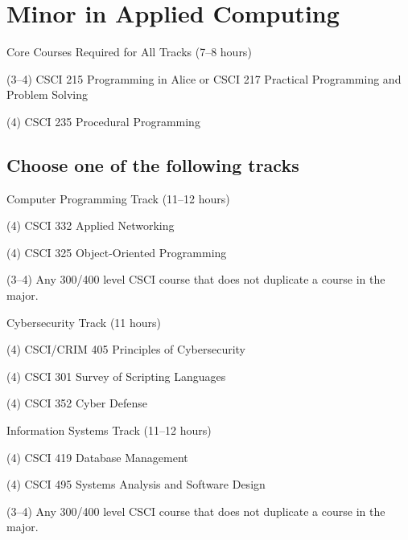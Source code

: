 %
\section*{Minor in Applied Computing}

\begin{reqgroup}{Core Courses Required for All Tracks (7--8 hours)}
\begin{checklist}
\begin{minipage}[t]{0.5\linewidth}
	\item (3--4) CSCI 215 Programming in Alice or CSCI 217 Practical Programming and Problem Solving
	\item (4) CSCI 235	Procedural Programming
\end{minipage}
\begin{minipage}[t]{0.5\linewidth}
\end{minipage}
\end{checklist}
\end{reqgroup}

\vspace{1em}
\subsection*{Choose one of the following tracks}

\begin{reqgroup}{Computer Programming Track (11--12 hours)}
\begin{checklist}
	\item (4) CSCI 332 Applied Networking
	\item (4) CSCI 325 Object-Oriented Programming
	\item (3--4) Any 300/400 level CSCI course that does not duplicate a course in the major.
\end{checklist}
\end{reqgroup}

\begin{reqgroup}{Cybersecurity Track (11 hours)}
\begin{checklist}
	\item (4) CSCI/CRIM 405 Principles of Cybersecurity
	\item (4) CSCI 301 Survey of Scripting Languages
	\item (4) CSCI 352 Cyber Defense
\end{checklist}
\end{reqgroup}

\begin{reqgroup}{Information Systems Track (11--12 hours)}
\begin{checklist}
	\item (4) CSCI 419 Database Management
	\item (4) CSCI 495 Systems Analysis and Software Design
	\item (3--4) Any 300/400 level CSCI course that does not duplicate a course in the major.
\end{checklist}
\end{reqgroup}

